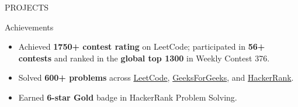 \documentclass{resume}
\begin{document}
\begin{rSection}{PROJECTS}
\begin{itemize}




\end{itemize}
\end{rSection}


\begin{rSection}{Achievements}
\begin{itemize}
  \item Achieved \textbf{1750+ contest rating} on LeetCode; participated in
        \textbf{56+ contests} and ranked in the \textbf{global top 1300}
        in Weekly Contest 376.
  \item Solved \textbf{600+ problems} across
        \href{https://leetcode.com/u/Roshan_kumar7989/}{LeetCode},
        \href{https://auth.geeksforgeeks.org/user/roshan_sahu/}{GeeksForGeeks}, and
        \href{https://www.hackerrank.com/rsahu7989}{HackerRank}.
  \item Earned \textbf{6-star Gold} badge in HackerRank Problem Solving.
\end{itemize}
\end{rSection}
\end{document}
